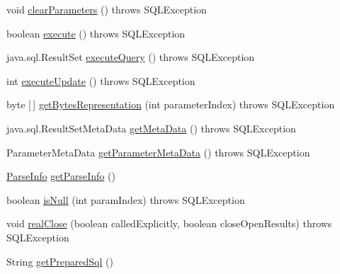 \begin{DoxyCompactItemize}
\item 
void \mbox{\hyperlink{classcom_1_1mysql_1_1cj_1_1jdbc_1_1_client_prepared_statement_ac5cdbe167c97f7e988f168974c07320f}{clear\+Parameters}} ()  throws S\+Q\+L\+Exception 
\item 
boolean \mbox{\hyperlink{classcom_1_1mysql_1_1cj_1_1jdbc_1_1_client_prepared_statement_aa56b43407e27aeea76e689e2663014e2}{execute}} ()  throws S\+Q\+L\+Exception 
\item 
java.\+sql.\+Result\+Set \mbox{\hyperlink{classcom_1_1mysql_1_1cj_1_1jdbc_1_1_client_prepared_statement_a3c87e86e004b4f406cef86e3738546b8}{execute\+Query}} ()  throws S\+Q\+L\+Exception 
\item 
int \mbox{\hyperlink{classcom_1_1mysql_1_1cj_1_1jdbc_1_1_client_prepared_statement_a71cd036bccd4ec78a85b861e4a548e1f}{execute\+Update}} ()  throws S\+Q\+L\+Exception 
\item 
byte \mbox{[}$\,$\mbox{]} \mbox{\hyperlink{classcom_1_1mysql_1_1cj_1_1jdbc_1_1_client_prepared_statement_a75034efc58565c3b3e5b8bcced7db9eb}{get\+Bytes\+Representation}} (int parameter\+Index)  throws S\+Q\+L\+Exception 
\item 
java.\+sql.\+Result\+Set\+Meta\+Data \mbox{\hyperlink{classcom_1_1mysql_1_1cj_1_1jdbc_1_1_client_prepared_statement_ae1f37a264e7a4a58d3f57bed796b1b38}{get\+Meta\+Data}} ()  throws S\+Q\+L\+Exception 
\item 
Parameter\+Meta\+Data \mbox{\hyperlink{classcom_1_1mysql_1_1cj_1_1jdbc_1_1_client_prepared_statement_aa3c5258b8ab6b147f5d24606d121f7d9}{get\+Parameter\+Meta\+Data}} ()  throws S\+Q\+L\+Exception 
\item 
\mbox{\hyperlink{classcom_1_1mysql_1_1cj_1_1_parse_info}{Parse\+Info}} \mbox{\hyperlink{classcom_1_1mysql_1_1cj_1_1jdbc_1_1_client_prepared_statement_a0983ede42add411efe5197093530698a}{get\+Parse\+Info}} ()
\item 
boolean \mbox{\hyperlink{classcom_1_1mysql_1_1cj_1_1jdbc_1_1_client_prepared_statement_aa3bd6acd74d7817920960edc3a656232}{is\+Null}} (int param\+Index)  throws S\+Q\+L\+Exception 
\item 
void \mbox{\hyperlink{classcom_1_1mysql_1_1cj_1_1jdbc_1_1_client_prepared_statement_a352b21fa4a782cfad4065a227985201a}{real\+Close}} (boolean called\+Explicitly, boolean close\+Open\+Results)  throws S\+Q\+L\+Exception 
\item 
String \mbox{\hyperlink{classcom_1_1mysql_1_1cj_1_1jdbc_1_1_client_prepared_statement_aa34204b558f5f8eeec0764fbc44ef7bf}{get\+Prepared\+Sql}} ()
\item 

\end{DoxyCompactItemize}
